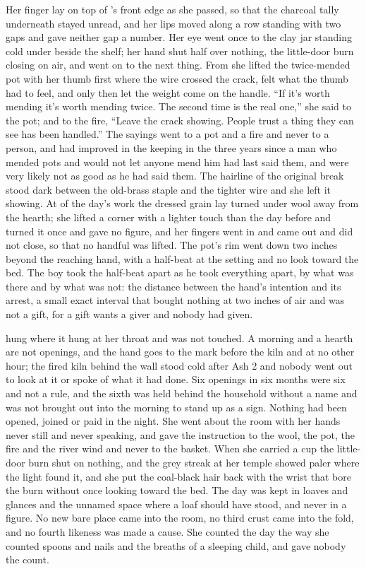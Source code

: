 Her finger lay on top of 's front edge as she passed, so that the charcoal tally underneath stayed unread, and her lips moved along a row standing with two gaps and gave neither gap a number. Her eye went once to the clay jar standing cold under  beside the shelf; her hand shut half over nothing, the little-door burn closing on air, and went on to the next thing. From  she lifted the twice-mended pot with her thumb first where the wire crossed the crack, felt what the thumb had to feel, and only then let the weight come on the handle. “If it's worth mending it's worth mending twice. The second time is the real one,” she said to the pot; and to the fire, “Leave the crack showing. People trust a thing they can see has been handled.” The sayings went to a pot and a fire and never to a person, and had improved in the keeping in the three years since a man who mended pots and would not let anyone mend him had last said them, and were very likely not as good as he had said them. The hairline of the original break stood dark between the old-brass staple and the tighter wire and she left it showing. At  of the day's work the dressed grain lay turned under wool away from the hearth; she lifted a corner with a lighter touch than the day before and turned it once and gave no figure, and her fingers went in and came out and did not close, so that no handful was lifted. The pot's rim went down two inches beyond the reaching hand, with a half-beat at the setting and no look toward the bed. The boy took the half-beat apart as he took everything apart, by what was there and by what was not: the distance between the hand's intention and its arrest, a small exact interval that bought nothing at two inches of air and was not a gift, for a gift wants a giver and nobody had given.

 hung where it hung at her throat and was not touched. A morning and a hearth are not openings, and the hand goes to the mark before the kiln and at no other hour; the fired kiln behind the wall stood cold after Ash 2 and nobody went out to look at it or spoke of what it had done. Six openings in six months were six and not a rule, and the sixth was held behind the household without a name and was not brought out into the morning to stand up as a sign. Nothing had been opened, joined or paid in the night. She went about the room with her hands never still and never speaking, and gave the instruction to the wool, the pot, the fire and the river wind and never to the basket. When she carried a cup the little-door burn shut on nothing, and the grey streak at her temple showed paler where the light found it, and she put the coal-black hair back with the wrist that bore the burn without once looking toward the bed. The day was kept in loaves and glances and the unnamed space where a loaf should have stood, and never in a figure. No new bare place came into the room, no third crust came into the fold, and no fourth likeness was made a cause. She counted the day the way she counted spoons and nails and the breaths of a sleeping child, and gave nobody the count.

